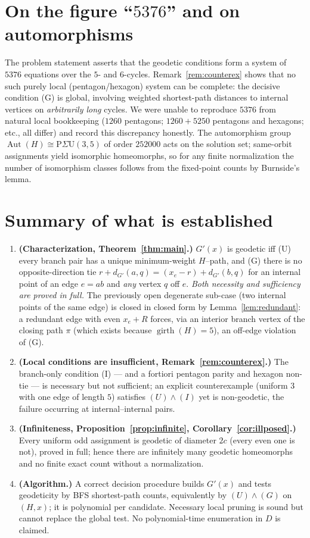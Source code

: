 \documentclass{amsart}
\theoremstyle{definition}
\begin{document}
\section{On the figure ``$5376$'' and on automorphisms}

The problem statement asserts that the geodetic conditions form a system of
$5376$ equations over the $5$- and $6$-cycles. Remark~\ref{rem:counterex} shows
that no such purely local (pentagon/hexagon) system can be complete: the decisive
condition (G) is global, involving weighted shortest-path distances to internal
vertices on \emph{arbitrarily long} cycles. We were unable to reproduce $5376$
from natural local bookkeeping ($1260$ pentagons; $1260+5250$ pentagons and
hexagons; etc., all differ) and record this discrepancy honestly. The
automorphism group $\operatorname{Aut}(H)\cong\mathrm P\Sigma\mathrm U(3,5)$ of
order $252000$ acts on the solution set; same-orbit assignments yield isomorphic
homeomorphs, so for any finite normalization the number of isomorphism classes
follows from the fixed-point counts by Burnside's lemma.

\section{Summary of what is established}

\begin{enumerate}
\item \textbf{(Characterization, Theorem~\ref{thm:main}.)} $G'(x)$ is geodetic
iff (U) every branch pair has a unique minimum-weight $H$--path, and (G) there is
no opposite-direction tie $r+d_{G'}(a,q)=(x_e-r)+d_{G'}(b,q)$ for an internal
point of an edge $e=ab$ and \emph{any} vertex $q$ off $e$. \emph{Both necessity
and sufficiency are proved in full.} The previously open degenerate sub-case (two
internal points of the same edge) is closed in closed form by
Lemma~\ref{lem:redundant}: a redundant edge with even $x_e+R$ forces, via an
interior branch vertex of the closing path $\pi$ (which exists because
$\operatorname{girth}(H)=5$), an off-edge violation of (G).
\item \textbf{(Local conditions are insufficient, Remark~\ref{rem:counterex}.)}
The branch-only condition (I) --- and a fortiori pentagon parity and hexagon
non-tie --- is necessary but not sufficient; an explicit counterexample (uniform
$3$ with one edge of length $5$) satisfies $(U)\wedge(I)$ yet is non-geodetic,
the failure occurring at internal--internal pairs.
\item \textbf{(Infiniteness, Proposition~\ref{prop:infinite},
Corollary~\ref{cor:illposed}.)} Every uniform odd assignment is geodetic of
diameter $2c$ (every even one is not), proved in full; hence there are infinitely
many geodetic homeomorphs and no finite exact count without a normalization.
\item \textbf{(Algorithm.)} A correct decision procedure builds $G'(x)$ and
tests geodeticity by BFS shortest-path counts, equivalently by $(U)\wedge(G)$ on
$(H,x)$; it is polynomial per candidate. Necessary local pruning is sound but
cannot replace the global test. No polynomial-time enumeration in $D$ is claimed.
\end{enumerate}
\end{document}
